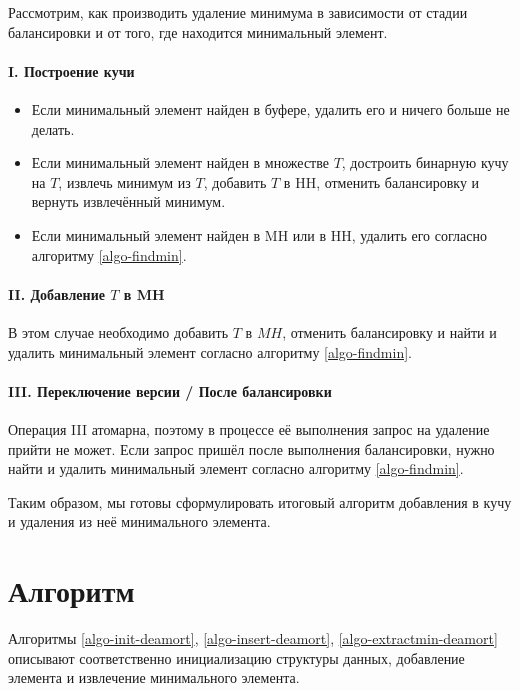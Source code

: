 Рассмотрим, как производить удаление минимума в зависимости от стадии балансировки
и от того, где находится минимальный элемент.

\paragraph{I. Построение кучи}
\begin{itemize}
\item Если минимальный элемент найден в буфере, удалить его и ничего больше не делать.
\item Если минимальный элемент найден в множестве $T$, достроить бинарную кучу на $T$,
извлечь минимум из $T$, добавить $T$ в HH, отменить балансировку
и вернуть извлечённый минимум.
\item Если минимальный элемент найден в MH или в HH, удалить его согласно алгоритму \ref{algo-findmin}.
\end{itemize}

\paragraph{II. Добавление $T$ в MH}
В этом случае необходимо добавить $T$ в $MH$, отменить балансировку и найти и удалить
минимальный элемент согласно алгоритму \ref{algo-findmin}.

\paragraph{III. Переключение версии / После балансировки}
Операция III атомарна, поэтому в процессе её выполнения запрос на удаление прийти не может.
Если запрос пришёл после выполнения балансировки, нужно найти и удалить минимальный
элемент согласно алгоритму \ref{algo-findmin}.

Таким образом, мы готовы сформулировать итоговый алгоритм добавления в кучу
и удаления из неё минимального элемента.

\newcommand{\BalState}{\texttt{BalancingState} }
\newcommand{\BufCap}{\texttt{BufferCapacity} }
\newcommand{\BufSize}{\texttt{BufferSize} }
\newcommand{\ElemCount}{\texttt{InsertionsCount} }
\newcommand{\myC}{\texttt{C} }
\newcommand{\NoAction}{\texttt{NoAction} }
\newcommand{\StateI}{\texttt{StateI} }
\newcommand{\StateII}{\texttt{StateII} }
\newcommand{\Gets}{\ $\gets$\ }
\newcommand{\Loc}{\texttt{Location} }
 
\section{Алгоритм}
Алгоритмы \ref{algo-init-deamort}, \ref{algo-insert-deamort}, \ref{algo-extractmin-deamort}
описывают соответственно инициализацию структуры данных, добавление элемента и извлечение
минимального элемента.

